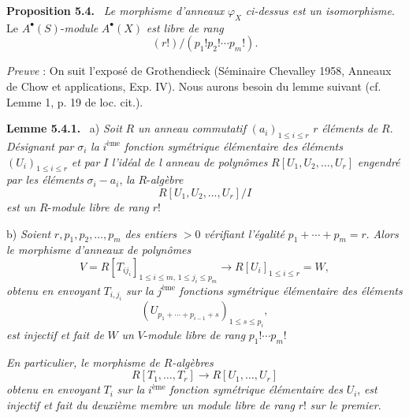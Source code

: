 \documentclass[11pt]{article}
\newenvironment{statement}[1]{\par\medskip\noindent\textbf{#1.}\ }{\par\medskip}
\begin{document}
\begin{statement}{Proposition 5.4}
\emph{Le morphisme d'anneaux} $\varphi_X$ \emph{ci-dessus est un isomorphisme}. Le $A^{\bullet}(S)$-\emph{module} $A^{\bullet}(X)$ \emph{est libre de rang}
\[
(r!)/(p_1!p_2!\cdots p_m!).
\]
\end{statement}

\emph{Preuve} : On
suit l'exposé de Grothendieck (Séminaire Chevalley 1958, Anneaux de Chow et applications, Exp. IV). Nous aurons besoin du lemme suivant (cf. Lemme 1, p. 19 de loc. cit.).

\begin{statement}{Lemme 5.4.1}
a) \emph{Soit} $R$ \emph{un anneau commutatif} $(a_i)_{1\le i\le r}$ $r$ \emph{éléments de} $R$. \emph{Désignant par} $\sigma_i$ \emph{la} $i^{\text{ème}}$ \emph{fonction symétrique élémentaire des éléments} $(U_i)_{1\le i\le r}$ \emph{et par} $I$ \emph{l'idéal de l anneau de polynômes} $R[U_1,U_2,\ldots,U_r]$ \emph{engendré par les éléments} $\sigma_i-a_i$, \emph{la} $R$-\emph{algèbre}
\[
R[U_1,U_2,\ldots,U_r]/I
\]
\emph{est un} $R$-\emph{module libre de rang} $r!$

b) \emph{Soient} $r,p_1,p_2,\ldots,p_m$ \emph{des entiers} $>0$ \emph{vérifiant l'égalité} $p_1+\cdots+p_m=r$. \emph{Alors le morphisme d'anneaux de polynômes}
\[
V=R[T_{ij_i}]_{1\le i\le m,\,1\le j_i\le p_m}
\longrightarrow R[U_i]_{1\le i\le r}=W,
\]
\emph{obtenu en envoyant} $T_{i,j_i}$ \emph{sur la} $j^{\text{ème}}$ \emph{fonctions symétrique élémentaire des éléments}
\[
(U_{p_1+\cdots+p_{i-1}+s})_{1\le s\le p_i},
\]
\emph{est injectif et fait de} $W$ \emph{un} $V$-\emph{module libre de rang} $p_1!\cdots p_m!$

\emph{En particulier, le morphisme de $R$-algèbres}
\[
R[T_1,\ldots,T_r]\to R[U_1,\ldots,U_r]
\]
\emph{obtenu en envoyant} $T_i$ \emph{sur la} $i^{\text{ème}}$ \emph{fonction symétrique élémentaire des} $U_i$, \emph{est injectif et fait du deuxième membre un module libre de rang} $r!$ \emph{sur le premier}.
\end{statement}
\end{document}

